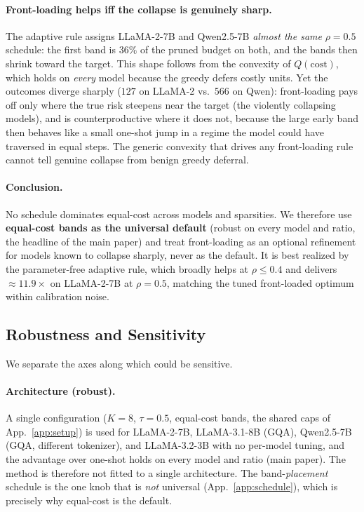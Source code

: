\paragraph{Front-loading helps iff the collapse is genuinely sharp.} The adaptive rule assigns
LLaMA-2-7B and Qwen2.5-7B \emph{almost the same} $\rho{=}0.5$ schedule: the first band is $36\%$ of the
pruned budget on both, and the bands then shrink toward the target. This shape follows from the convexity of
$Q(\text{cost})$, which holds on \emph{every} model because the greedy defers costly units. Yet the outcomes diverge sharply ($127$ on LLaMA-2
vs.\ $566$ on Qwen): front-loading pays off only where the true risk steepens near the target (the
violently collapsing models), and is counterproductive where it does not, because the large early band then
behaves like a small one-shot jump in a regime the model could have traversed in equal steps. The generic
convexity that drives any front-loading rule cannot tell genuine collapse from benign greedy deferral.

\paragraph{Conclusion.} No schedule dominates equal-cost across models and sparsities. We therefore use
\textbf{equal-cost bands as the universal default} (robust on every model and ratio, the headline of the main paper) and treat front-loading as an optional refinement for models known to collapse sharply,
never as the default. It is best realized by the parameter-free adaptive rule, which broadly helps at
$\rho{\le}0.4$ and delivers $\approx\!11.9\times$ on LLaMA-2-7B at $\rho{=}0.5$, matching the tuned
front-loaded optimum within calibration noise.

\subsection{Robustness and Sensitivity}
\label{app:robustness}
We separate the axes along which \method could be sensitive.

\paragraph{Architecture (robust).} A single configuration ($K{=}8$, $\tau{=}0.5$, equal-cost bands, the
shared caps of App.~\ref{app:setup}) is used for LLaMA-2-7B, LLaMA-3.1-8B (GQA), Qwen2.5-7B (GQA,
different tokenizer), and LLaMA-3.2-3B with no per-model tuning, and the advantage over one-shot holds on
every model and ratio (main paper). The method is therefore not fitted to a single
architecture. The band-\emph{placement} schedule is the one knob that is \emph{not} universal
(App.~\ref{app:schedule}), which is precisely why equal-cost is the default.

